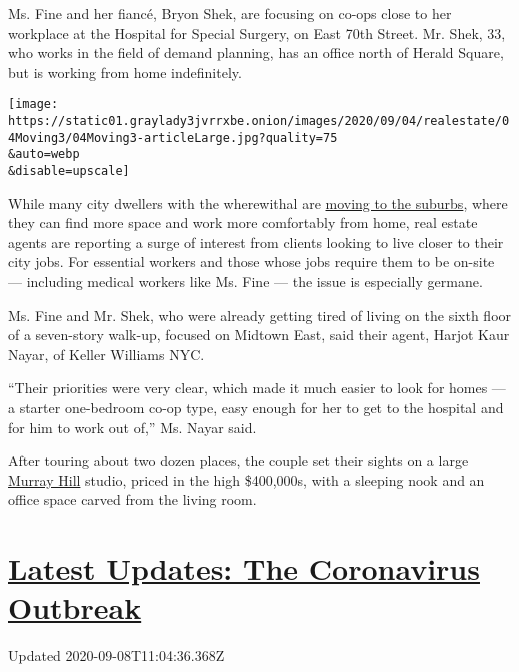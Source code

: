 Ms. Fine and her fiancé, Bryon Shek, are focusing on co-ops close to her
workplace at the Hospital for Special Surgery, on East 70th Street. Mr.
Shek, 33, who works in the field of demand planning, has an office north
of Herald Square, but is working from home indefinitely.

\texttt{[image: https://static01.graylady3jvrrxbe.onion/images/2020/09/04/realestate/04Moving3/04Moving3-articleLarge.jpg?quality=75\\\&auto=webp\\\&disable=upscale]}

While many city dwellers with the wherewithal are
\href{https://www.nytimes3xbfgragh.onion/2020/08/30/nyregion/nyc-suburbs-housing-demand.html}{moving
to the suburbs}, where they can find more space and work more
comfortably from home, real estate agents are reporting a surge of
interest from clients looking to live closer to their city jobs. For
essential workers and those whose jobs require them to be on-site ---
including medical workers like Ms. Fine --- the issue is especially
germane.

Ms. Fine and Mr. Shek, who were already getting tired of living on the
sixth floor of a seven-story walk-up, focused on Midtown East, said
their agent, Harjot Kaur Nayar, of Keller Williams NYC.

``Their priorities were very clear, which made it much easier to look
for homes --- a starter one-bedroom co-op type, easy enough for her to
get to the hospital and for him to work out of,'' Ms. Nayar said.

After touring about two dozen places, the couple set their sights on a
large
\href{https://www.nytimes3xbfgragh.onion/2017/12/20/realestate/living-in-murray-hill-manhattan.html}{Murray
Hill} studio, priced in the high \$400,000s, with a sleeping nook and an
office space carved from the living room.

\hypertarget{latest-updates-the-coronavirus-outbreak}{%
\section{\texorpdfstring{\href{https://www.nytimes3xbfgragh.onion/2020/09/08/world/covid-19-coronavirus.html?action=click\&pgtype=Article\&state=default\&region=MAIN_CONTENT_1\&context=storylines_live_updates}{Latest
Updates: The Coronavirus
Outbreak}}{Latest Updates: The Coronavirus Outbreak}}\label{latest-updates-the-coronavirus-outbreak}}

Updated 2020-09-08T11:04:36.368Z

